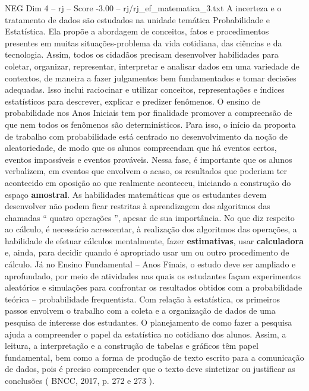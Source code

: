 \begin{textsample}{NEG Dim 4 – rj – Score -3.00 – rj/rj\_ef\_matematica\_3.txt}  \label{ex:f4_neg_121}
A incerteza e o tratamento de dados são estudados na unidade temática Probabilidade e Estatística.
Ela propõe a abordagem de conceitos, fatos e procedimentos presentes em muitas situações-problema da vida cotidiana, das ciências e da tecnologia.
Assim, todos os cidadãos precisam desenvolver habilidades para coletar, organizar, representar, interpretar e analisar dados em uma variedade de contextos, de maneira a fazer julgamentos bem fundamentados e tomar decisões adequadas.
Isso inclui raciocinar e utilizar conceitos, representações e índices estatísticos para descrever, explicar e predizer fenômenos.
O ensino de probabilidade nos Anos Iniciais tem por finalidade promover a compreensão de que nem todos os fenômenos são determinísticos.
Para isso, o início da proposta de trabalho com probabilidade está centrado no desenvolvimento da noção de aleatoriedade, de modo que os alunos compreendam que há eventos certos, eventos impossíveis e eventos prováveis.
Nessa fase, é importante que os alunos verbalizem, em eventos que envolvem o acaso, os resultados que poderiam ter acontecido em oposição ao que realmente aconteceu, iniciando a construção do espaço \textbf{amostral}.
As habilidades matemáticas que os estudantes devem desenvolver não podem ficar restritas à aprendizagem dos algoritmos das chamadas “ quatro operações ”, apesar de sua importância.
No que diz respeito ao cálculo, é necessário acrescentar, à realização dos algoritmos das operações, a habilidade de efetuar cálculos mentalmente, fazer \textbf{estimativas}, usar \textbf{calculadora} e, ainda, para decidir quando é apropriado usar um ou outro procedimento de cálculo.
Já no Ensino Fundamental – Anos Finais, o estudo deve ser ampliado e aprofundado, por meio de atividades nas quais os estudantes façam experimentos aleatórios e simulações para confrontar os resultados obtidos com a probabilidade teórica – probabilidade frequentista.
Com relação à estatística, os primeiros passos envolvem o trabalho com a coleta e a organização de dados de uma pesquisa de interesse dos estudantes.
O planejamento de como fazer a pesquisa ajuda a compreender o papel da estatística no cotidiano dos alunos.
Assim, a leitura, a interpretação e a construção de tabelas e gráficos têm papel fundamental, bem como a forma de produção de texto escrito para a comunicação de dados, pois é preciso compreender que o texto deve sintetizar ou justificar as conclusões ( BNCC, 2017, p. 272 e 273 ).

\end{textsample}
